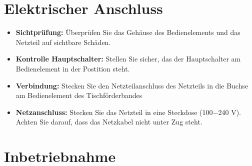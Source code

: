 	
	
	

\section{Elektrischer Anschluss}

\begin{itemize}
	\item \textbf{Sichtprüfung:} Überprüfen Sie das Gehäuse des Bedienelements und das Netzteil auf sichtbare Schäden.
	
	\item \textbf{Kontrolle Hauptschalter:} Stellen Sie sicher, das der Hauptschalter am Bedienelement in der Postition  steht. 
	
	\item \textbf{Verbindung:} Stecken Sie den Netzteilanschluss des Netzteils in die Buchse am Bedienelement des Tischförderbandes
	
	\item \textbf{Netzanschluss:} Stecken Sie das Netzteil in eine Steckdose (100$-$240 V). Achten Sie darauf, dass das Netzkabel nicht unter Zug steht.
	
\end{itemize}

\section{Inbetriebnahme}
\label{sec:Inbetriebnahme}


